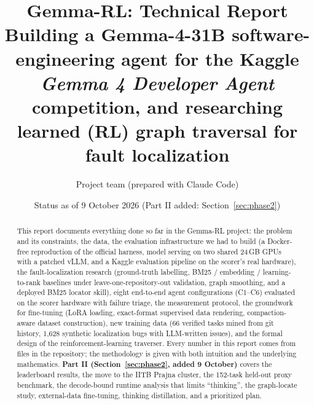 \documentclass[10pt,a4paper]{article}
\title{\textbf{Gemma-RL: Technical Report}\\[4pt]
\large Building a Gemma-4-31B software-engineering agent for the Kaggle \emph{Gemma 4 Developer Agent}
competition, and researching learned (RL) graph traversal for fault localization}
\author{Project team \quad (prepared with Claude Code)}
\date{Status as of 9 October 2026 (Part II added: Section~\ref{sec:phase2})}
\newcommand{\1}{\mathbb{1}}
\begin{document}
\maketitle
\begin{abstract}
\noindent This report documents everything done so far in the Gemma-RL project: the problem and its
constraints, the data, the evaluation infrastructure we had to build (a Docker-free reproduction of the
official harness, model serving on two shared 24\,GB GPUs with a patched vLLM, and a Kaggle evaluation
pipeline on the scorer's real hardware), the fault-localization research (ground-truth labelling,
BM25 / embedding / learning-to-rank baselines under leave-one-repository-out validation, graph smoothing,
and a deployed BM25 locator skill), eight end-to-end agent configurations (C1--C6) evaluated on the
scorer hardware with failure triage, the measurement protocol, the groundwork for fine-tuning (LoRA
loading, exact-format supervised data rendering, compaction-aware dataset construction), new training
data (66 verified tasks mined from git history, 1{,}628 synthetic localization bugs with LLM-written issues),
and the formal design of the reinforcement-learning traverser. Every number in this report comes from
files in the repository; the methodology is given with both intuition and the underlying mathematics. \textbf{Part II (Section~\ref{sec:phase2}, added 9 October)} covers the leaderboard results, the move to the IITB Prajna cluster, the 152-task held-out proxy benchmark, the decode-bound runtime analysis that limits ``thinking'', the graph-locate study, external-data fine-tuning, thinking distillation, and a prioritized plan.
\end{abstract}

\tableofcontents
\newpage

\end{document}
